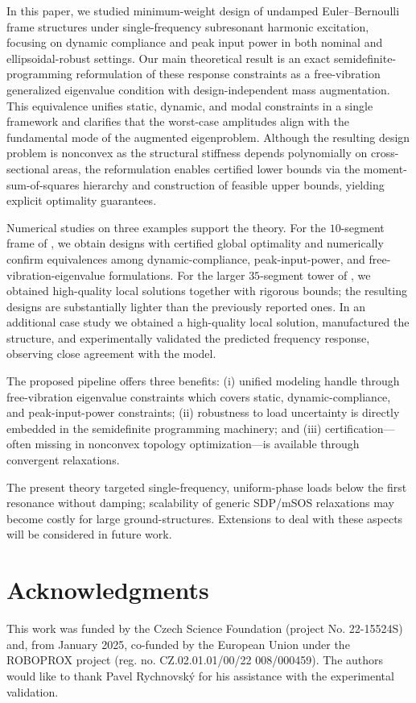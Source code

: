 \documentclass[preprint,3p]{elsarticle}
\numberwithin{equation}{section}
\begin{document}
In this paper, we studied minimum-weight design of undamped Euler--Bernoulli frame structures under single-frequency subresonant harmonic excitation, focusing on dynamic compliance and peak input power in both nominal and ellipsoidal-robust settings. Our main theoretical result is an exact semidefinite-programming reformulation of these response constraints as a free-vibration generalized eigenvalue condition with design-independent mass augmentation. This equivalence unifies static, dynamic, and modal constraints in a single framework and clarifies that the worst-case amplitudes align with the fundamental mode of the augmented eigenproblem. Although the resulting design problem is nonconvex as the structural stiffness depends polynomially on cross-sectional areas, the reformulation enables certified lower bounds via the moment-sum-of-squares hierarchy and construction of feasible upper bounds, yielding explicit optimality guarantees.

Numerical studies on three examples support the theory. For the $10$-segment frame of \citet[Section 5.1]{Ni2014}, we obtain designs with certified global optimality and numerically confirm equivalences among dynamic-compliance, peak-input-power, and free-vibration-eigenvalue formulations. For the larger $35$-segment tower of \citet[Section 5.2]{Ni2014}, we obtained high-quality local solutions together with rigorous bounds; the resulting designs are substantially lighter than the previously reported ones. In an additional case study we obtained a high-quality local solution, manufactured the structure, and experimentally validated the predicted frequency response, observing close agreement with the model.

The proposed pipeline offers three benefits: (i) unified modeling handle through free-vibration eigenvalue constraints which covers static, dynamic-compliance, and peak-input-power constraints; (ii) robustness to load uncertainty is directly embedded in the semidefinite programming machinery; and (iii) certification---often missing in nonconvex topology optimization---is available through convergent relaxations.

The present theory targeted single-frequency, uniform-phase loads below the first resonance without damping; scalability of generic SDP/mSOS relaxations may become costly for large ground-structures. Extensions to deal with these aspects will be considered in future work.

\section*{Acknowledgments}
This work was funded by the Czech Science Foundation (project No. 22-15524S) and, from January 2025, co-funded by the European Union under the ROBOPROX project (reg. no. CZ.02.01.01/00/22 008/000459). The authors would like to thank Pavel Rychnovský for his assistance with the experimental validation.
\end{document}
